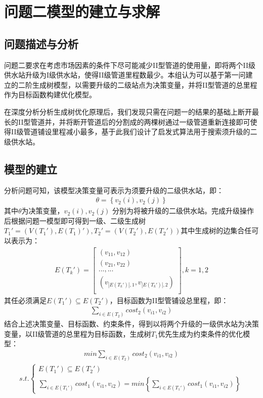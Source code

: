 \documentclass{whutmod}
\begin{document}
	\section{问题二模型的建立与求解}
		\subsection{问题描述与分析}	
			问题二要求在考虑市场因素的条件下尽可能减少II型管道的使用量，即将两个II级供水站升级为I级供水站，使得II级管道里程数最少。本组认为可以基于第一问建立的二阶生成树模型，以需要升级的二级站点为决策变量，并将II型管道的总里程作为目标函数构建优化模型。
			
			在深度分析分析生成树优化原理后，我们发现只需在问题一的结果的基础上断开最长的II型管道并，并将断开管道后的分割成的两棵树通过一级管道重新连接即可使得II级管道铺设里程减小最多，基于此我们设计了启发式算法用于搜索须升级的二级供水站。
			\subsection{模型的建立}
			分析问题可知，该模型决策变量可表示为须要升级的二级供水站，即：
				\begin{gather}
				\theta =\left \{ v_2(i),v_2(j) \right \}
				\end{gather}
			其中$\theta$为决策变量，$v_2(i),v_2(j)$ 分别为将被升级的二级供水站。完成升级操作后根据问题一模型即可得到一级、二级生成树$T_{1}'=(V(T_{1}'),E(T_{1})'),T_{2}'=(V(T_{2}'),E(T_{2}'))$其中生成树的边集合任可以表示为：
			\begin{gather}
			E(T_k')=
		\begin{bmatrix}
		(v_{11} ,v_{12}) \\ 
		(v_{21} ,v_{22} )\\ 
		...,...\\
		(v_{|E(T_k')|,1},v_{|E(T_k')|,2})\\
		\end{bmatrix},k=1,2
			\end{gather}
			其任必须满足$E(T_1')\subseteq E(T_2')$，目标函数为II型管铺设总里程，即：
			\begin{gather}
			\sum_{i\in E(T_2) }cost_2(v_{i1},v_{i2})
			\end{gather}
			结合上述决策变量、目标函数、约束条件，得到以将两个升级的一级供水站为决策变量，以II级管道的总里程为目标函数，生成树$T_1$优先生成为约束条件的优化模型：
			\begin{gather}
			min  \sum_{i\in E(T_2) }cost_2(v_{i1},v_{i2})
			\end{gather}
			\begin{gather*}
			s.t.\left\{\begin{matrix}
			E(T_{1}')\subseteq  E(T_{2}')\\ 
			\sum_{i\in E(T_1') }cost_1(v_{i1},v_{i2})=min\left \{ 	\sum_{i\in E(T_1') }cost_1(v_{i1},v_{i2}) \right \} 
			\end{matrix}\right.
			\end{gather*}
\end{document}
